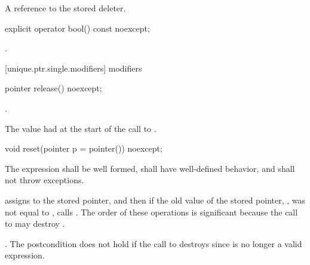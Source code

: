 \begin{itemdescr}
\pnum
\returns A reference to the stored deleter.
\end{itemdescr}

\begin{itemdecl}
explicit operator bool() const noexcept;
\end{itemdecl}

\begin{itemdescr}
\pnum
\returns {}.
\end{itemdescr}

[unique.ptr.single.modifiers]{ modifiers}

\begin{itemdecl}
pointer release() noexcept;
\end{itemdecl}

\begin{itemdescr}
\pnum
\postcondition {}.

\pnum
\returns The value  had at the start of
the call to .
\end{itemdescr}

\begin{itemdecl}
void reset(pointer p = pointer()) noexcept;
\end{itemdecl}

\begin{itemdescr}
\pnum
\requires The expression  shall be well formed, shall have
well-defined behavior, and shall not throw exceptions.

\pnum
\effects assigns  to the stored pointer, and then if the old value of the
stored pointer, , was not equal to , calls
. \enternote The order of these operations is significant
because the call to  may destroy . \exitnote

\pnum
\postconditions {}.
\enternote The postcondition does not hold if the call to 
destroys  since  is no longer a valid expression.
\exitnote
\end{itemdescr}

